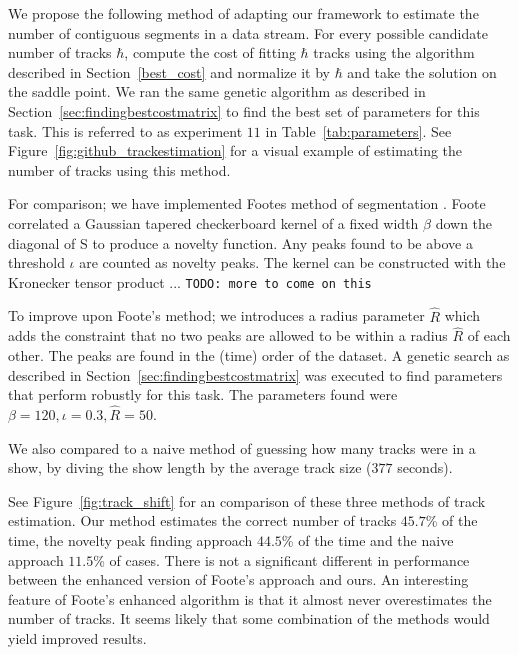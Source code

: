 \documentclass[twocolumn]{article}
\begin{document}
We propose the following method of adapting our framework to estimate the number of contiguous segments in a data stream. For every possible candidate number of tracks $\hbar$, compute the cost of fitting $\hbar$ tracks using the algorithm described in Section~\ref{best_cost} and normalize it by $\hbar$ and take the solution on the saddle point. We ran the same genetic algorithm as described in Section~\ref{sec:findingbestcostmatrix} to find the best set of parameters for this task. This is referred to as experiment $11$ in Table~\ref{tab:parameters}. See Figure~\ref{fig:github_trackestimation} for a visual example of estimating the number of tracks using this method. 

For comparison; we have implemented Footes method of segmentation \citep{foote2003media}. Foote correlated a Gaussian tapered checkerboard kernel of a fixed width $\beta$ down the diagonal of S to produce a novelty function. Any peaks found to be above a threshold $\iota$ are counted as novelty peaks. The kernel can be constructed with the Kronecker tensor product ... \texttt{TODO: more to come on this} 

To improve upon Foote's method; we introduces a radius parameter $\hat R$ which adds the constraint that no two peaks are allowed to be within a radius $\hat R$ of each other. The peaks are found in the (time) order of the dataset. A genetic search as described in Section~\ref{sec:findingbestcostmatrix} was executed to find parameters that perform robustly for this task. The parameters found were $\beta=120, \iota=0.3, \hat R=50$.

We also compared to a naive method of guessing how many tracks were in a show, by diving the show length by the average track size ($377$ seconds).

See Figure~\ref{fig:track_shift} for an comparison of these three methods of track estimation. Our method estimates the correct number of tracks $45.7$\% of the time, the novelty peak finding approach $44.5$\% of the time and the naive approach $11.5$\% of cases. There is not a significant different in performance between the enhanced version of Foote's approach and ours. An interesting feature of Foote's enhanced algorithm is that it almost never overestimates the number of tracks. It seems likely that some combination of the methods would yield improved results. 
\end{document}
